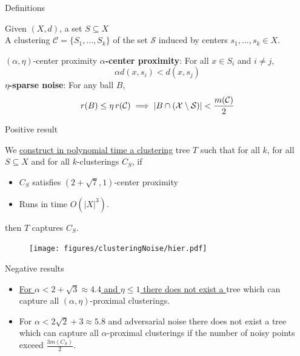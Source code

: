 \documentclass{beamer}
\newcommand{\mc}{\mathcal}
\begin{document}
\begin{frame}{Definitions}

	Given $(X, d)$, a set $S \subseteq X$\\
	\vspace{10pt}A clustering $\mc C = \{S_1, \ldots, S_k\}$ of the set $\mc S$ induced by centers $s_1, \ldots, s_k \in X$.

	\vspace{10pt}\begin{block}{$(\alpha, \eta)$-center proximity}
	\vspace{0.5cm} {\bf $\alpha$-center proximity}: For all $x \in S_i$ and $i\neq j$, $$\alpha d(x, s_i) < d(x, s_j)$$
	{\bf $\eta$-sparse noise}: For any ball $B$, 
	$$r(B)\leq \eta \thinspace r(\mc{C}) \implies |B\cap (\mc X\setminus \mc S)| < \frac{m(\mc C)}{2}$$
	\end{block}
\end{frame}


\begin{frame}[label=positiveSarseNoise]{Positive result}
	\begin{block}{}
		We \hyperlink{detailsPositiveSparseNoise}{construct in polynomial time a clustering} tree $T$ such that for all $k$, for all $S \subseteq X$ and for all $k$-clusterings $C_S$, if 
	  	\begin{itemize}
	  		\item $C_S$ satisfies \alert{$(2+\sqrt{7}, 1)$}-center proximity
	  		\item Runs in time $O(|X|^3)$.
	  	\end{itemize}
	  	then $T$ captures $C_S$.
  	\end{block}
  	
	\begin{figure}
	  \texttt{[image: figures/clusteringNoise/hier.pdf]}
	\end{figure}	  	
\end{frame}

\begin{frame}[label=negativeSparseNoise]{Negative results}
	\begin{block}{}
  \begin{itemize}
  	\vspace{10pt}\item \hyperlink{detailsNegativeSparseNoise}{For \alert{$\alpha < 2 +\sqrt{3}\approx 4.4$} and $\eta \le 1$ there does not exist a }tree which can capture all $(\alpha, \eta)$-proximal clusterings. 
	\vspace{20pt}\item For \alert{$\alpha < 2\sqrt{2} + 3 \approx 5.8$} and adversarial noise there does not exist a tree which can capture all $\alpha$-proximal clusterings if the number of noisy points exceed $\frac{3m(C_S)}{2}$. 
	\end{itemize}	 
	\end{block}
\end{frame}
\end{document}
